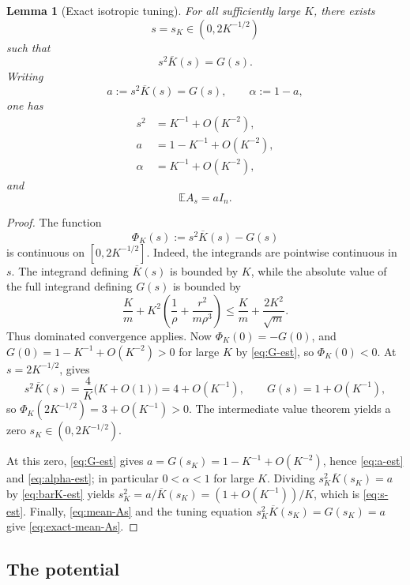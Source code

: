 \documentclass[11pt]{article}
\theoremstyle{plain}
\newtheorem{lemma}[theorem]{Lemma}
\theoremstyle{definition}
\theoremstyle{remark}
\newcommand{\E}{\mathbb{E}}
\newcommand{\Id}{I}
\newcommand{\1}{\mathbf{1}}
\begin{document}
\begin{lemma}[Exact isotropic tuning]
\label{lem:tuning}
For all sufficiently large $K$, there exists
\[
    s=s_K\in(0,2K^{-1/2})
\]
such that
\begin{equation}
    s^2\overline K(s)=G(s).
    \label{eq:tuning}
\end{equation}
Writing
\begin{equation}
    a:=s^2\overline K(s)=G(s),
    \qquad
    \alpha:=1-a,
    \label{eq:a-alpha}
\end{equation}
one has
\begin{align}
    s^2
    &=
    K^{-1}+O(K^{-2}),
    \label{eq:s-est}\\
    a
    &=
    1-K^{-1}+O(K^{-2}),
    \label{eq:a-est}\\
    \alpha
    &=
    K^{-1}+O(K^{-2}),
    \label{eq:alpha-est}
\end{align}
and
\begin{equation}
    \E A_s=a\Id_n.
    \label{eq:exact-mean-As}
\end{equation}
\end{lemma}

\begin{proof}
The function
\[
    \Phi_K(s):=s^2\overline K(s)-G(s)
\]
is continuous on $[0,2K^{-1/2}]$. Indeed, the integrands are pointwise
continuous in $s$. The integrand defining $\overline K(s)$ is bounded by
$K$, while the absolute value of the full integrand defining $G(s)$ is
bounded by
\[
    \frac Km
    +
    K^2\left(\frac1\rho+\frac{r^2}{m\rho^3}\right)
    \leq
    \frac Km+\frac{2K^2}{\sqrt m}.
\]
Thus dominated convergence applies. Now $\Phi_K(0)=-G(0)$,
and $G(0)=1-K^{-1}+O(K^{-2})>0$ for large $K$ by \eqref{eq:G-est}, so
$\Phi_K(0)<0$. At $s=2K^{-1/2}$,  gives
\[
    s^2\overline K(s)=\frac4K\bigl(K+O(1)\bigr)=4+O(K^{-1}),
    \qquad
    G(s)=1+O(K^{-1}),
\]
so $\Phi_K(2K^{-1/2})=3+O(K^{-1})>0$. The intermediate value theorem yields a
zero $s_K\in(0,2K^{-1/2})$.

At this zero, \eqref{eq:G-est} gives $a=G(s_K)=1-K^{-1}+O(K^{-2})$, hence
\eqref{eq:a-est} and \eqref{eq:alpha-est}; in particular $0<\alpha<1$ for
large $K$. Dividing $s_K^2\overline K(s_K)=a$ by \eqref{eq:barK-est} yields
$s_K^2=a/\overline K(s_K)=(1+O(K^{-1}))/K$, which is \eqref{eq:s-est}.
Finally, \eqref{eq:mean-As} and the tuning equation
$s_K^2\overline K(s_K)=G(s_K)=a$ give \eqref{eq:exact-mean-As}.
\end{proof}

\subsection{The potential}
\end{document}
